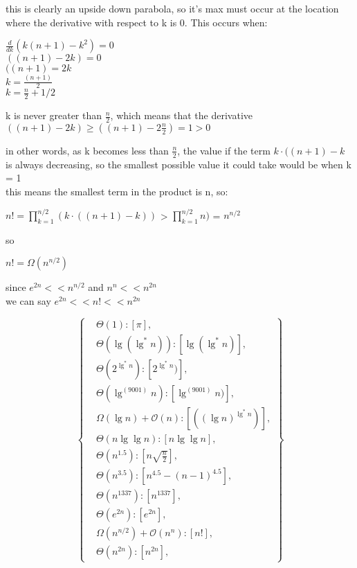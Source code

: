 \documentclass[11pt,fleqn]{article}
\theoremstyle{definition}
\theoremstyle{remark}
\begin{document}
this is clearly an upside down parabola, so it's max must occur
at the location where the derivative with respect to k is 0.
This occurs when:

$\frac{d}{dk}(k(n + 1) - k^2) = 0$\\
$((n + 1) - 2k) = 0$\\
$((n + 1) = 2k$\\
$k = \frac{(n + 1)}{2}$\\
$k = \frac{n}{2} + 1/2$

k is never greater than $\frac{n}{2}$, which means that
the derivative $((n + 1) - 2k) \geq ((n + 1) - 2\frac{n}{2}) = 1 > 0$ 

in other words, as k becomes less than $\frac{n}{2}$, the value
if the term $k \cdot ((n + 1) - k$ is always decreasing, so the smallest
possible value it could take would be when k = 1\\

this means the smallest term in the product is n, so:

$n! = \prod_{k=1}^{n/2} (k \cdot ((n + 1) - k))$ >
$\prod_{k=1}^{n/2} n)$ = $n^{n/2}$

so 

$n! = \Omega(n^{n/2})$

since $e^{2n} << n^{n/2}$ and $n^n << n^{2n}$\\

we can say $e^{2n} << n! << n^{2n}$

\[
\left\{
\begin{aligned}
& \Theta(1): [\pi],\\
& \Theta(\lg(\lg^*n)): [\lg(\lg^*n)],\\
& \Theta(2^{\lg^*n}): [2^{\lg^*n})],\\
& \Theta(\lg^{(9001)} n): [\lg^{(9001)} n)],\\
& \Omega(\lg n) + \mathcal{O}(n): [({(\lg n)}^{\lg^*{n}})],\\
& \Theta(n\lg \lg n): [n\lg \lg n],\\
& \Theta(n^{1.5}): [n\sqrt{\frac{n}{2}}],\\
& \Theta(n^{3.5}): [n^{4.5} - (n - 1)^{4.5}],\\ 
& \Theta(n^{1337}): [n^{1337}],\\
& \Theta(e^{2n}): [e^{2n}],\\
& \Omega(n^{n/2}) + \mathcal{O}(n^n): [n!],\\
& \Theta(n^{2n}): [n^{2n}],
\end{aligned}
\right\}
\]\\
\end{document}
